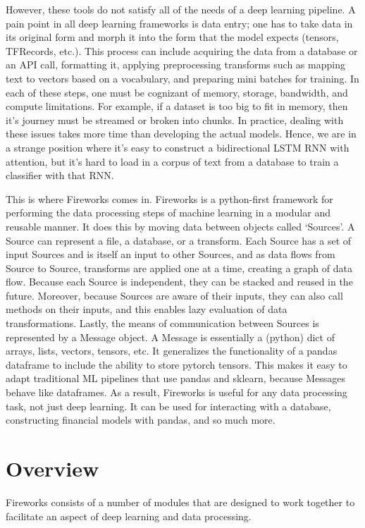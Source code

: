 \documentclass[letterpaper,10pt,english]{sphinxmanual}
\begin{document}
However, these tools do not satisfy all of the needs of a deep learning pipeline. A pain point in all deep learning frameworks is data entry; one has to take data in its original form and morph it into the form that the model expects (tensors, TFRecords, etc.). This process can include acquiring the data from a database or an API call, formatting it, applying preprocessing transforms such as mapping text to vectors based on a vocabulary, and preparing mini batches for training. In each of these steps, one must be cognizant of memory, storage, bandwidth, and compute limitations. For example, if a dataset is too big to fit in memory, then it’s journey must be streamed or broken into chunks. In practice, dealing with these issues takes more time than developing the actual models. Hence, we are in a strange position where it’s easy to construct a bidirectional LSTM RNN with attention, but it’s hard to load in a corpus of text from a database to train a classifier with that RNN.

This is where Fireworks comes in. Fireworks is a python-first framework for performing the data processing steps of machine learning in a modular and reusable manner. It does this by moving data between objects called ‘Sources’. A Source can represent a file, a database, or a transform. Each Source has a set of input Sources and is itself an input to other Sources, and as data flows from Source to Source, transforms are applied one at a time, creating a graph of data flow. Because each Source is independent, they can be stacked and reused in the future. Moreover, because Sources are aware of their inputs, they can also call methods on their inputs, and this enables lazy evaluation of data transformations. Lastly, the means of communication between Sources is represented by a Message object. A Message is essentially a (python) dict of arrays, lists, vectors, tensors, etc. It generalizes the functionality of a pandas dataframe to include the ability to store pytorch tensors. This makes it easy to adapt traditional ML pipelines that use pandas and sklearn, because Messages behave like dataframes. As a result, Fireworks is useful for any data processing task, not just deep learning. It can be used for interacting with a database, constructing financial models with pandas, and so much more.


\chapter{Overview}
\label{\detokenize{index:overview}}
Fireworks consists of a number of modules that are designed to work together to facilitate an aspect of deep learning and data processing.
\end{document}
